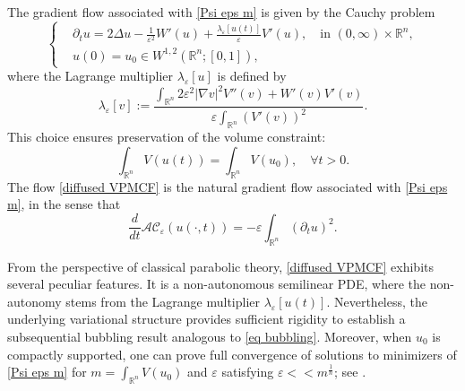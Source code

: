 \documentclass[11pt,letterpaper,reqno]{amsart}
\newcommand{\R}{\mathbb{R}}
\newcommand{\e}{\varepsilon}
\theoremstyle{plain}%
\theoremstyle{definition}
\numberwithin{equation}{section}
\numberwithin{figure}{section}
\begin{document}
The gradient flow associated with \eqref{Psi eps m} is given by the Cauchy problem
\begin{equation}
\label{diffused VPMCF} 
\left\{
\begin{aligned}
&\partial_t u = 2 \Delta u - \frac{1}{\varepsilon^2} W'(u) + \frac{\lambda_\varepsilon[u(t)]}{\varepsilon} V'(u), \quad \text{in } (0,\infty)\times \R^n , \\
&u(0) = u_0 \in W^{1,2}(\R^n;[0,1]),
\end{aligned}
\right.
\end{equation}
where the Lagrange multiplier $\lambda_\varepsilon[u]$ is defined by
\begin{equation*}
\lambda_\varepsilon[v] := \frac{\int_{\R^n} 2 \varepsilon^2 |\nabla v|^2 V''(v) + W'(v) V'(v)}{\varepsilon \int_{\R^n} (V'(v))^2}.
\end{equation*}
This choice ensures preservation of the volume constraint:
\begin{equation*}
\int_{\R^n} V(u(t)) = \int_{\R^n} V(u_0), \quad \forall t>0.
\end{equation*}
The flow \eqref{diffused VPMCF} is the natural gradient flow associated with \eqref{Psi eps m}, in the sense that
\begin{equation*}
\frac{d}{dt} \mathcal{AC}_\e(u(\cdot,t)) = - \varepsilon \int_{\R^n} (\partial_t u)^2.
\end{equation*}

From the perspective of classical parabolic theory, \eqref{diffused VPMCF} exhibits several peculiar features. It is a non-autonomous semilinear PDE, where the non-autonomy stems from the Lagrange multiplier $\lambda_\varepsilon[u(t)]$. Nevertheless, the underlying variational structure provides sufficient rigidity to establish a subsequential bubbling result analogous to \eqref{eq bubbling}. Moreover, when $u_0$ is compactly supported, one can prove full convergence of solutions to minimizers of \eqref{Psi eps m} for $m = \int_{\R^n} V(u_0)$ and $\varepsilon$ satisfying $\varepsilon << m^\frac{1}{n}$; see \cite[Theorems 1.3--1.4]{bonforte2024asymptotic}.  
\end{document}
